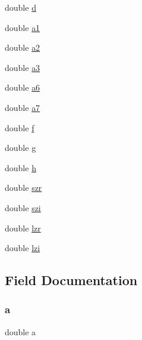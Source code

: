 \begin{DoxyCompactItemize}
\item 
double \mbox{\hyperlink{struct_r_poly___state_a873684cefeb665f3d5e6b495de57fc0d}{d}}
\item 
double \mbox{\hyperlink{struct_r_poly___state_a5d015a3751aec61f2442b957cb6f517a}{a1}}
\item 
double \mbox{\hyperlink{struct_r_poly___state_ac55c2d269ed76bd9bdb7fb25f3533a4e}{a2}}
\item 
double \mbox{\hyperlink{struct_r_poly___state_aac922a785af4fb14fc828152cd94c34e}{a3}}
\item 
double \mbox{\hyperlink{struct_r_poly___state_a262a722d3594ad39af78a42345686ebd}{a6}}
\item 
double \mbox{\hyperlink{struct_r_poly___state_a74a305674806348134c904038f117b8d}{a7}}
\item 
double \mbox{\hyperlink{struct_r_poly___state_a2e13cbaaba1951fdfe9e83d8b031e802}{f}}
\item 
double \mbox{\hyperlink{struct_r_poly___state_ab30c765b9be1b7776c97c899a12a66bb}{g}}
\item 
double \mbox{\hyperlink{struct_r_poly___state_a8ee9be1b5aa75abae556de3088cba6d9}{h}}
\item 
double \mbox{\hyperlink{struct_r_poly___state_a3e54b6894f6a4694585055d4dd849c38}{szr}}
\item 
double \mbox{\hyperlink{struct_r_poly___state_a143eaac5a856111b4112b0d51094c76d}{szi}}
\item 
double \mbox{\hyperlink{struct_r_poly___state_a53e6d47f579c98c46ab0340ea776fce8}{lzr}}
\item 
double \mbox{\hyperlink{struct_r_poly___state_a332ef2aff9ea857ed67b1d2dcb85a772}{lzi}}
\end{DoxyCompactItemize}


\subsection{Field Documentation}
\mbox{\label{struct_r_poly___state_a1031d0e0a97a340abfe0a6ab9e831045}} 
\subsubsection{\texorpdfstring{a}{a}}
{\footnotesize\ttfamily double a}

\mbox{\label{struct_r_poly___state_a5d015a3751aec61f2442b957cb6f517a}} 
